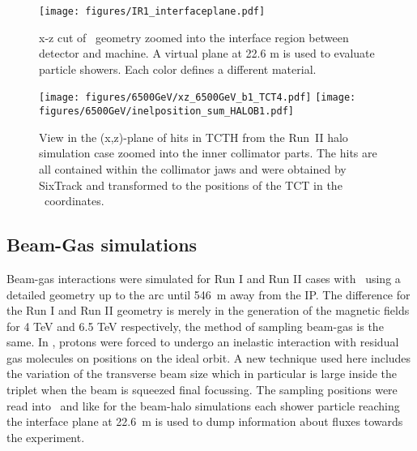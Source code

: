 

\begin{figure}%
\begin{center}
\texttt{[image: figures/IR1\_interfaceplane.pdf]}
\end{center}
\vspace{-0.6cm}
 \caption{x-z cut of \fluka~geometry zoomed into the interface region between detector and machine. A virtual plane at 22.6 m is used to evaluate particle showers. Each color defines a different material.
  \label{flukaGeo_nominal}}
\end{figure}


\begin{figure}%
\begin{center}
  \texttt{[image: figures/6500GeV/xz\_6500GeV\_b1\_TCT4.pdf]}
  \texttt{[image: figures/6500GeV/inelposition\_sum\_HALOB1.pdf]}
\end{center}
\vspace{-0.6cm}
 \caption{View in the (x,z)-plane of hits in TCTH from the Run~II halo simulation case zoomed into the inner collimator parts. The hits are all contained within the collimator jaws and were obtained by SixTrack and transformed to the positions of the TCT in the \fluka~coordinates.
  \label{tctHits}}
\end{figure}


\subsection{Beam-Gas simulations}
Beam-gas interactions were simulated for Run I and Run II cases with \fluka~using a detailed geometry up to the arc until 546~m away from the IP. %
The difference for the Run I and Run II geometry is merely in the generation of the magnetic fields for 4 TeV and 6.5 TeV respectively, the method of sampling beam-gas is the same. In \fluka, protons were forced to undergo an inelastic interaction with residual gas molecules on positions on the ideal orbit. A new technique used here includes the variation of the transverse beam size which in particular is large inside the triplet when the beam is squeezed final focussing. 
The sampling positions were read into \fluka~and like for the beam-halo simulations each shower particle reaching the interface plane at 22.6~m is used to dump information about fluxes towards the experiment. 

